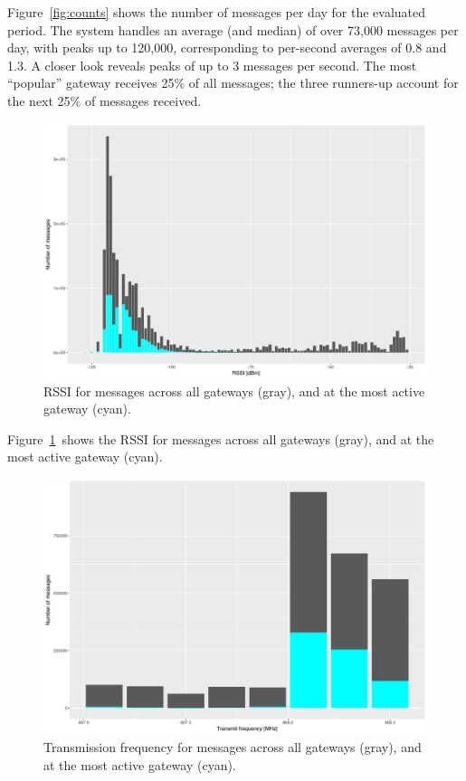 Figure~\ref{fig:counts} shows the number of messages per day for the
evaluated period. The system handles an average (and median) of over
73,000 messages per day, with peaks up to 120,000, corresponding to
per-second averages of 0.8 and 1.3. A closer look reveals peaks
of up to 3 messages per second. The most ``popular'' gateway
receives 25\% of all messages; the three runners-up account for
the next 25\% of messages received.

\begin{figure}
  \centering
  \includegraphics[width=\columnwidth]{figures/rssi.pdf}
  \caption{\acrshort{RSSI} for messages across all gateways (gray), and at the most active gateway (cyan).}
  \label{fig:rssi}
\end{figure}

Figure~\ref{fig:rssi} shows the \gls{RSSI} for messages across all
gateways (gray), and at the most active gateway (cyan).




\begin{figure}
  \centering
  \includegraphics[width=\columnwidth]{figures/qrg.pdf}
  \caption{Transmission frequency for messages across all gateways (gray), and at the most active gateway (cyan).}
  \label{fig:qrg}
\end{figure}

